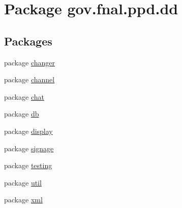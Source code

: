 \hypertarget{namespacegov_1_1fnal_1_1ppd_1_1dd}{\section{Package gov.\-fnal.\-ppd.\-dd}
\label{namespacegov_1_1fnal_1_1ppd_1_1dd}
}
\subsection*{Packages}
\begin{DoxyCompactItemize}
\item 
package \hyperlink{namespacegov_1_1fnal_1_1ppd_1_1dd_1_1changer}{changer}
\item 
package \hyperlink{namespacegov_1_1fnal_1_1ppd_1_1dd_1_1channel}{channel}
\item 
package \hyperlink{namespacegov_1_1fnal_1_1ppd_1_1dd_1_1chat}{chat}
\item 
package \hyperlink{namespacegov_1_1fnal_1_1ppd_1_1dd_1_1db}{db}
\item 
package \hyperlink{namespacegov_1_1fnal_1_1ppd_1_1dd_1_1display}{display}
\item 
package \hyperlink{namespacegov_1_1fnal_1_1ppd_1_1dd_1_1signage}{signage}
\item 
package \hyperlink{namespacegov_1_1fnal_1_1ppd_1_1dd_1_1testing}{testing}
\item 
package \hyperlink{namespacegov_1_1fnal_1_1ppd_1_1dd_1_1util}{util}
\item 
package \hyperlink{namespacegov_1_1fnal_1_1ppd_1_1dd_1_1xml}{xml}
\end{DoxyCompactItemize}

